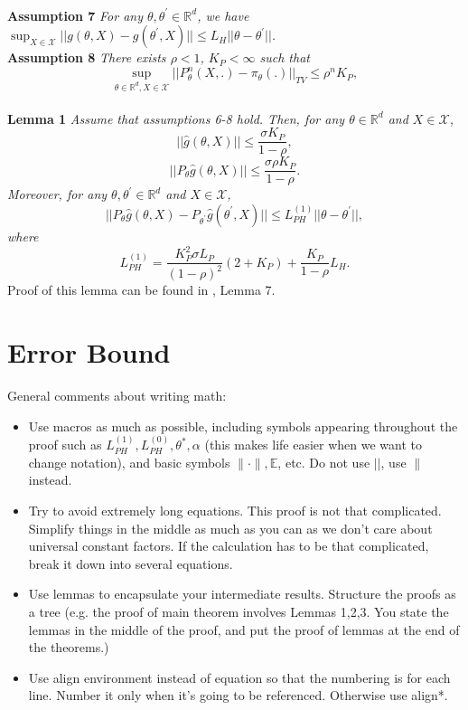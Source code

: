 \documentclass[a4paper]{article}
\newcommand{\Exs}{\mathbb{E}}
\newcommand{\thetastar}{\theta^*}
\newcommand{\constLPH}[1]{L_{PH}^{(#1)}}
\newcommand{\mwlcomment}[1]{{\color{orange} #1}}
\newcommand{\stepsize}{\alpha}
\begin{document}
\\
\textbf{Assumption 7} \textit{
For any $\theta, \theta^{\prime} \in \mathbb{R}^{d}$, we have $\sup_{X \in \mathcal{X}}||g\left(\theta, X\right) - g\left(\theta^{\prime}, X\right)|| \le L_{H}||\theta - \theta^{\prime}||$.
}
\\
\textbf{Assumption 8} \textit{
There exists $\rho < 1$, $K_{P} < \infty$ such that
\begin{equation}
	\sup_{\theta \in \mathbb{R}^{d}, X \in \mathcal{X}} ||P_{\theta}^{n}\left(X, .\right) - \pi_{\theta}(.)||_{TV} \le \rho^{n}K_{P},
\end{equation}
}
\\
\textbf{Lemma 1} \textit{
Assume that assumptions 6-8 hold. Then, for any $\theta \in \mathbb{R}^{d}$ and $X \in \mathcal{X}$,
\begin{equation}
	||\hat{g}\left(\theta, X\right)|| \le \frac{\sigma K_{P}}{1 - \rho},
\end{equation}
\begin{equation}
	||P_{\theta}\hat{g}\left(\theta, X\right)|| \le \frac{\sigma \rho K_{P}}{1 - \rho}.
\end{equation}
Moreover, for any $\theta, \theta^{\prime} \in \mathbb{R}^{d}$ and $X \in \mathcal{X}$,
\begin{equation}
	||P_{\theta}\hat{g}\left(\theta, X\right) - P_{\theta^{\prime}}\hat{g}\left(\theta^{\prime}, X\right)|| \le L_{PH}^{(1)}||\theta - \theta^{\prime}||,
\end{equation}
where
\begin{equation}
	L_{PH}^{(1)} = \frac{K_{P}^{2}\sigma L_{P}}{(1 - \rho)^{2}}\left(2 + K_{P}\right) + \frac{K_{P}}{1 - \rho}L_{H}.
\end{equation}
}
Proof of this lemma can be found in \cite{karimi2019non}, Lemma 7.
\section{Error Bound}
\mwlcomment{General comments about writing math:
\begin{itemize}
	\item Use macros as much as possible, including symbols appearing throughout the proof such as $\constLPH{1}, \constLPH{0}, \thetastar, \stepsize$ (this makes life easier when we want to change notation), and basic symbols $\| \cdot\|, \Exs$, etc. Do not use $||$, use $\|$ instead.
	\item Try to avoid extremely long equations. This proof is not that complicated. Simplify things in the middle as much as you can as we don't care about universal constant factors. If the calculation has to be that complicated, break it down into several equations.
	\item Use lemmas to encapsulate your intermediate results. Structure the proofs as a tree (e.g. the proof of main theorem involves Lemmas 1,2,3. You state the lemmas in the middle of the proof, and put the proof of lemmas at the end of the theorems.)
	\item Use align environment instead of equation so that the numbering is for each line. Number it only when it's going to be referenced. Otherwise use align*. 
\end{itemize}


}
\end{document}
